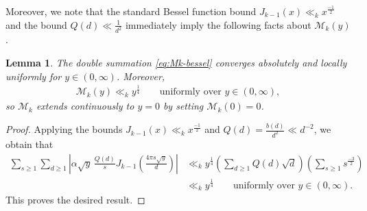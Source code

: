 \documentclass[12pt,letterpaper,reqno]{amsart}
\theoremstyle{plain}
\newtheorem{lemma}[theorem]{Lemma}
\theoremstyle{definition}
\numberwithin{equation}{section}
\numberwithin{figure}{section}
\numberwithin{table}{section}
\newcommand{\M}{\mathcal{M}}
\begin{document}
Moreover, we note that the standard Bessel function bound $J_{k-1}(x) \ll_k x^{\frac{-1}{2}}$ and the bound $Q(d) \ll \frac{1}{d^2}$ immediately imply the following facts about $\M_k(y)$.
\begin{lemma} \label{lem:Mk-convergence}
    The double summation
    \eqref{eq:Mk-bessel} converges absolutely and locally uniformly for
    $y\in(0,\infty)$. Moreover,
    \begin{align} \label{eq:Mk-at-zero}
        \M_k(y)\ll_k y^{\frac{1}{4}}
        \qquad \text{uniformly over $y \in (0,\infty)$},
    \end{align}
    so $\M_k$ extends continuously to $y=0$ by setting $\M_k(0)=0$.
\end{lemma}
\begin{proof}
Applying the bounds
$J_{k-1}(x)\ll_k x^{\frac{-1}{2}}$ and $Q(d)=\frac{b(d)}{d^2}\ll d^{-2}$, we obtain that
\begin{align}
\sum_{s\ge1}
\sum_{d\ge 1}
\left|
\alpha\sqrt y\,\frac{Q(d)}s
J_{k-1}\left(\frac{4\pi s\sqrt y}{d}\right)
\right|
&\ll_k y^{\frac{1}{4}}
\left(\sum_{d\ge1}Q(d)\sqrt d\right)
\left(\sum_{s\ge1}s^{\frac{-3}{2}}\right) \\
&\ll_k y^{\frac{1}{4}} \qquad \text{uniformly over $y \in (0,\infty)$.}
\end{align}
This proves the desired result.
\end{proof}
\end{document}
